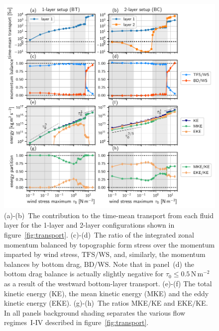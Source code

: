 \documentclass{agujournal2019}
\newcommand{\Pa}		{\mathrm{N}\,\mathrm{m}^{-2}}
\newcommand{\ws} {\mathrm{WS}}
\newcommand{\tfs} {\mathrm{TFS}}
\newcommand{\bd} {\mathrm{BD}}
\begin{document}
\begin{figure}[t]
\centering
\noindent\includegraphics[width=\textwidth]{transp_mombal_KE}
\caption{(a)-(b)~The contribution to the time-mean transport from each fluid layer for the 1-layer and 2-layer configurations shown in figure~\ref{fig:transport}. (c)-(d)~The ratio of the integrated zonal momentum balanced by topographic form stress over the momentum imparted by wind stress, $\tfs/\ws$, and, similarly, the momentum balances by bottom drag, $\bd/\ws$. Note that in panel~(d) the bottom drag balance is actually slightly negative for $\tau_0\le 0.5\,\Pa$ as a result of the westward bottom-layer transport. (e)-(f) The total kinetic energy (KE), the mean kinetic energy (MKE) and the eddy kinetic energy (EKE). (g)-(h)~The ratios  MKE$/$KE and EKE$/$KE. In all panels background shading separates the various flow regimes~I-IV described in figure~\ref{fig:transport}.}\label{fig:transportdecomp}\vspace*{-3em}
\end{figure}
\end{document}
